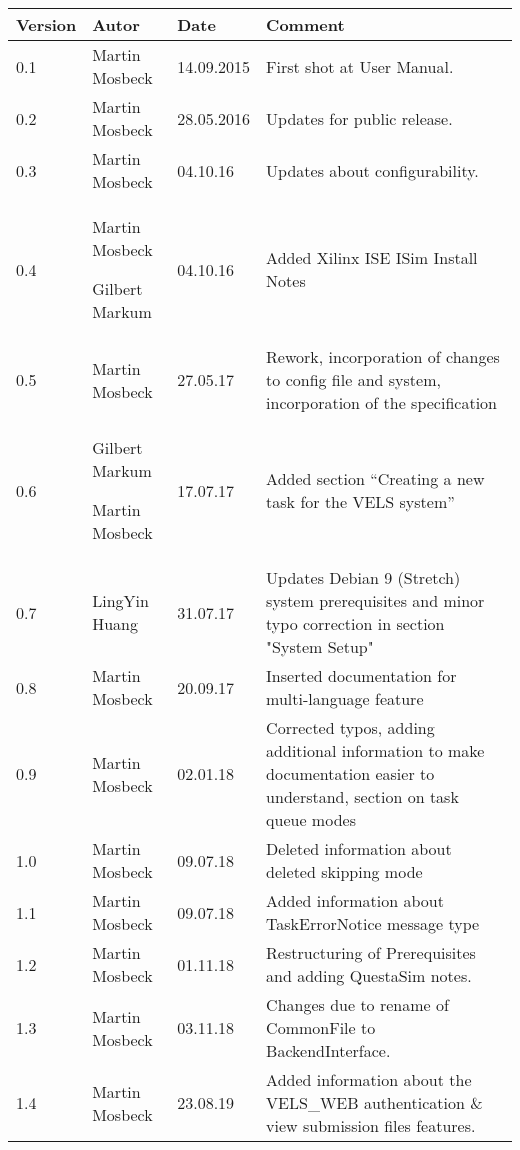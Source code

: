 
\begin{table}[h]
\begin{tabular*}{14.7cm}{|p{}|p{}|p{2cm}|p{}|}
\hline
Version & Autor & Date & Comment \\[2pt]
\hline
\hline
0.1 & Martin Mosbeck & 14.09.2015 & First shot at User Manual. \\[2pt]
\hline
0.2 & Martin Mosbeck & 28.05.2016 & Updates for public release. \\[2pt]
\hline
0.3 & Martin Mosbeck & 04.10.16 & Updates about configurability. \\[2pt]
\hline
0.4 & Martin Mosbeck \par Gilbert Markum & 04.10.16 & Added Xilinx ISE ISim Install Notes \\[2pt]
\hline
0.5 & Martin Mosbeck & 27.05.17 & Rework, incorporation of changes to config file and system, incorporation of the
specification \\[2pt]
\hline
0.6 & Gilbert Markum \par Martin Mosbeck & 17.07.17 & Added section ``Creating a new task for the VELS system'' \\[2pt]
\hline
0.7 & LingYin Huang & 31.07.17 & Updates Debian 9 (Stretch) system prerequisites and minor typo correction in section "System Setup" \\[2pt]
\hline
0.8 & Martin Mosbeck & 20.09.17 & Inserted documentation for multi-language feature \\[2pt]
\hline
0.9 & Martin Mosbeck & 02.01.18 & Corrected typos, adding additional information to make documentation easier to
understand, section on task queue modes  \\[2pt]
\hline
1.0 & Martin Mosbeck & 09.07.18 & Deleted information about deleted skipping mode \\[2pt]
\hline
1.1 & Martin Mosbeck & 09.07.18 & Added information about TaskErrorNotice message type\\[2pt]
\hline
1.2 & Martin Mosbeck & 01.11.18 & Restructuring of Prerequisites and adding QuestaSim notes.\\[2pt]
\hline
1.3 & Martin Mosbeck & 03.11.18 & Changes due to rename of CommonFile to BackendInterface.\\[2pt]
\hline
1.4 & Martin Mosbeck & 23.08.19 & Added information about the VELS\_WEB
authentication \& view submission files features.\\[2pt]
\hline
\end{tabular*}
\end{table}


